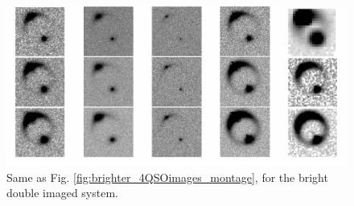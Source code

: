 \documentclass[a4paper,11pt]{article}
\begin{document}
\begin{figure}
\begin{center}
\includegraphics[width=1.0\textwidth]{figures/brighter_system_2QSOimages_all.png}
\end{center}
\caption{Same as Fig. \ref{fig:brighter_4QSOimages_montage}, for the bright double imaged system.}
\label{fig:brighter_2QSOimages_montage}
\end{figure}
\end{document}
